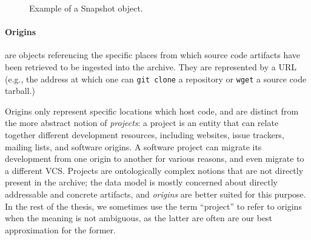 \begin{figure}%
    \centering
\caption{Example of a Snapshot object.}
\end{figure}



\begin{figure}\centering
{}
\end{figure}
\paragraph{\textbf{Origins}} are objects referencing the specific places from
which source code artifacts have been retrieved to be ingested into the
archive.  They are represented by a URL (e.g., the address at which
one can \texttt{git clone} a repository or \texttt{wget} a source code
tarball.)

Origins only represent specific locations which host code, and are distinct
from the more abstract notion of \emph{projects}: a project is an entity that
can relate together different development resources, including websites, issue
trackers, mailing lists, and software origins. A software project can migrate
its development from one origin to another for various reasons, and even
migrate to a different \gls{VCS}. Projects are ontologically complex notions
that are not directly present in the archive; the data model is mostly
concerned about directly addressable and concrete artifacts, and \emph{origins}
are better suited for this purpose. In the rest of the thesis, we sometimes use
the term ``project'' to refer to origins when the meaning is not ambiguous, as
the latter are often are our best approximation for the former.

